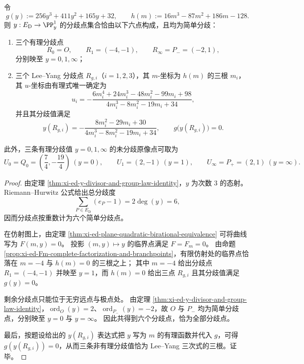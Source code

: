 \begin{theorem}\label{thm:xi-ed-y-branchpoints-leyang-via-hm}
令
\[
g(y):=256y^{3}+411y^{2}+165y+32,
\qquad
h(m):=16m^{3}-87m^{2}+186m-128.
\]
则 \(y:E_{\mathrm D}\to\PP^1_y\) 的分歧点集合恰由以下六点构成，且均为简单分歧：
\begin{enumerate}
  \item 三个有理分歧点
  \[
  R_{0}=O,\qquad R_{1}=(-4,-1),\qquad R_{\infty}=P_{-}=(-2,1),
  \]
  分别映至 \(y=0,1,\infty\)；
  \item 三个 Lee--Yang 分歧点 \(R_{g,i}\)（\(i=1,2,3\)），其 \(m\)-坐标为 \(h(m)\) 的三根 \(m_i\)，其 \(u\)-坐标由有理式唯一确定为
  \[
  u_i=
  -\frac{6m_{i}^{4}+24m_{i}^{3}-48m_{i}^{2}-99m_{i}+98}{4m_{i}^{3}-8m_{i}^{2}-19m_{i}+34},
  \]
  并且其分歧值满足
  \[
  y(R_{g,i})
  =
  -\frac{8m_{i}^{2}-29m_{i}+30}{4m_{i}^{3}-8m_{i}^{2}-19m_{i}+34},
  \qquad
  g\bigl(y(R_{g,i})\bigr)=0.
  \]
\end{enumerate}
此外，三条有理分歧值 \(y=0,1,\infty\) 的未分歧原像点可取为
\[
U_{0}=Q_{0}=\left(\frac74,-\frac{19}{4}\right)\ (y=0),\qquad
U_{1}=(2,-1)\ (y=1),\qquad
U_{\infty}=P_{+}=(2,1)\ (y=\infty).
\]
\end{theorem}
\begin{proof}
由定理 \ref{thm:xi-ed-y-divisor-and-group-law-identity}，\(y\) 为次数 \(3\) 的态射。
Riemann--Hurwitz 公式给出总分歧度
\[
\sum_{P\in E_{\mathrm D}}(e_P-1)=2\deg(y)=6,
\]
因而分歧点按重数计为六个简单分歧点。
\par
在仿射图上，由定理 \ref{thm:xi-ed-plane-quadratic-birational-equivalence} 可将曲线写为 \(F(m,y)=0\)。
投影 \((m,y)\mapsto y\) 的临界点满足 \(F=F_m=0\)。
由命题 \ref{prop:xi-ed-Fm-complete-factorization-and-branchpoints}，有限仿射处的临界点恰落在 \(m=-4\) 与 \(h(m)=0\) 的三根之上；
其中 \(m=-4\) 给出分歧点 \(R_1=(-4,-1)\) 并映至 \(y=1\)，而 \(h(m)=0\) 给出三点 \(R_{g,i}\) 且其分歧值满足 \(g(y)=0\)。
\par
剩余分歧点只能位于无穷远点与极点处。
由定理 \ref{thm:xi-ed-y-divisor-and-group-law-identity}，\(\operatorname{ord}_{O}(y)=2\)、\(\operatorname{ord}_{P_{-}}(y)=-2\)，故 \(O\) 与 \(P_{-}\) 均为简单分歧点，分别映至 \(y=0\) 与 \(y=\infty\)。
因此共得到六个分歧点，恰为全部分歧点。
\par
最后，按题设给出的 \(y(R_{g,i})\) 表达式把 \(y\) 写为 \(m\) 的有理函数并代入 \(g\)，可得 \(g(y(R_{g,i}))=0\)，从而三条非有理分歧值恰为 Lee--Yang 三次式的三根。证毕。
\end{proof}

